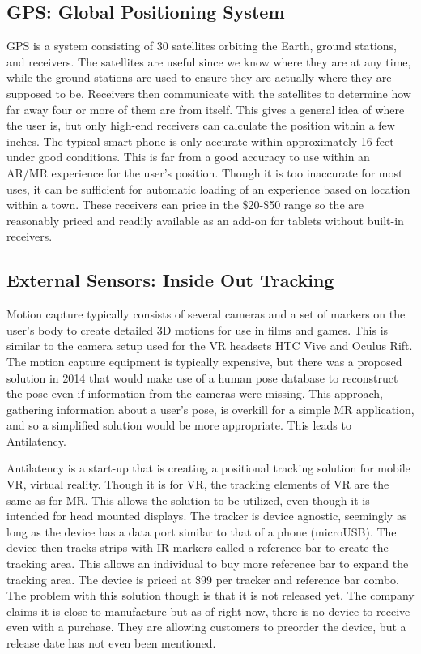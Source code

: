 \documentclass[10pt,draftclsnofoot,onecolumn,letterpaper]{IEEEtran}
\begin{document}
\subsection{GPS: Global Positioning System}
GPS is a system consisting of 30 satellites orbiting the Earth, ground stations, and receivers. The satellites are useful since we know where they are at any time, while the ground stations are used to ensure they are actually where they are supposed to be. Receivers then communicate with the satellites to determine how far away four or more of them are from itself. This gives a general idea of where the user is, but only high-end receivers can calculate the position within a few inches\cite{GPS}. The typical smart phone is only accurate within approximately 16 feet under good conditions\cite{GPSacc}. This is far from a good accuracy to use within an AR/MR experience for the user's position. Though it is too inaccurate for most uses, it can be sufficient for automatic loading of an experience based on location within a town. These receivers can price in the \$20-\$50 range so the are reasonably priced and readily available as an add-on for tablets without built-in receivers.

\subsection{External Sensors: Inside Out Tracking}
Motion capture typically consists of several cameras and a set of markers on the user's body to create detailed 3D motions for use in films and games\cite{MoCap}. This is similar to the camera setup used for the VR headsets HTC Vive and Oculus Rift. The motion capture equipment is typically expensive, but there was a proposed solution in 2014 that would make use of a human pose database to reconstruct the pose even if information from the cameras were missing\cite{MoCap}. This approach, gathering information about a user's pose, is overkill for a simple MR application, and so a simplified solution would be more appropriate. This leads to Antilatency.\par

Antilatency is a start-up that is creating a positional tracking solution for mobile VR, virtual reality. Though it is for VR, the tracking elements of VR are the same as for MR. This allows the solution to be utilized, even though it is intended for head mounted displays. The tracker is device agnostic, seemingly as long as the device has a data port similar to that of a phone (microUSB). The device then tracks strips with IR markers called a reference bar to create the tracking area. This allows an individual to buy more reference bar to expand the tracking area. The device is priced at \$99 per tracker and reference bar combo. The problem with this solution though is that it is not released yet. The company claims it is close to manufacture but as of right now, there is no device to receive even with a purchase. They are allowing customers to preorder the device, but a release date has not even been mentioned\cite{AL}.\par
\end{document}
